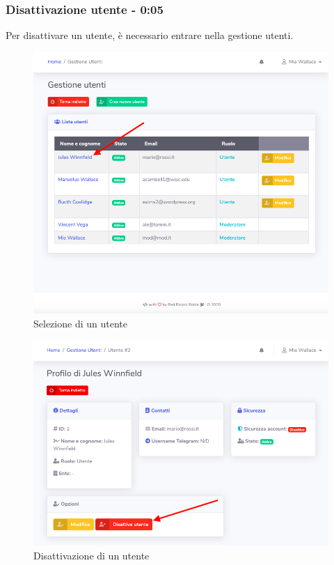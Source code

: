 	\subsubsection{Disattivazione utente - 0:05}
		Per disattivare un utente, è necessario entrare nella gestione utenti.
		\begin{figure}[H]
		\centering
		\includegraphics[scale=0.600]{res/images/mod/selUtente.png}
		\caption{Selezione di un utente}
	\end{figure}
	\begin{figure}[H]
		\centering
		\includegraphics[scale=0.600]{res/images/mod/elimUtente.png}
		\caption{Disattivazione di un utente}
	\end{figure}
